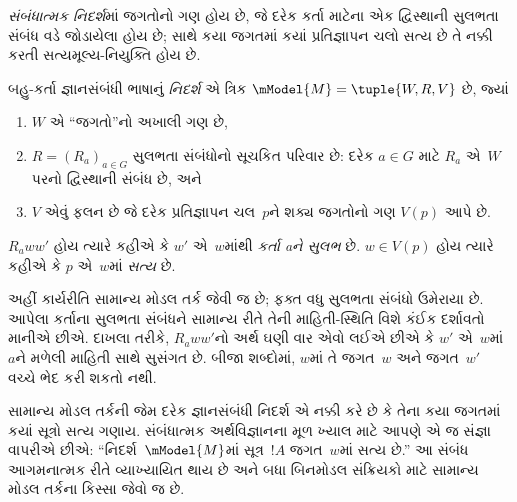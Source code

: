 \emph{સંબંધાત્મક નિદર્શ}માં જગતોનો ગણ હોય છે, જે દરેક કર્તા
માટેના એક દ્વિસ્થાની સુલભતા સંબંધ વડે જોડાયેલા હોય છે; સાથે
કયા જગતમાં કયાં પ્રતિજ્ઞાપન ચલો સત્ય છે તે નક્કી
કરતી સત્યમૂલ્ય-નિયુક્તિ હોય છે.

\begin{defn}
  બહુ-કર્તા જ્ઞાનસંબંધી ભાષાનું \emph{નિદર્શ} એ ત્રિક
  $\mModel{M} = \tuple{W, R, V}$ છે, જ્યાં
  \begin{enumerate}
  \item $W$ એ ``જગતો''નો અખાલી ગણ છે,
  \item $R=(R_a)_{a\in G}$ સુલભતા સંબંધોનો સૂચકિત પરિવાર છે:
  દરેક $a \in G$ માટે ${R}_a$ એ~$W$ પરનો દ્વિસ્થાની સંબંધ છે, અને
  \item $V$ એવું ફલન છે જે દરેક પ્રતિજ્ઞાપન ચલ~$p$ને શક્ય જગતોનો ગણ $V(p)$ આપે છે.
  \end{enumerate}
  $R_a ww'$ હોય ત્યારે કહીએ કે $w'$ એ~$w$માંથી
  \emph{કર્તા aને સુલભ} છે. $w \in V(p)$ હોય ત્યારે કહીએ કે
  $p$ એ~$w$માં \emph{સત્ય} છે.
\end{defn}


અહીં કાર્યરીતિ સામાન્ય મોડલ તર્ક જેવી જ છે; ફક્ત વધુ સુલભતા
સંબંધો ઉમેરાયા છે. આપેલા કર્તાના સુલભતા સંબંધને સામાન્ય રીતે
તેની માહિતી-સ્થિતિ વિશે કંઈક દર્શાવતો માનીએ છીએ. દાખલા તરીકે,
$R_a ww'$નો અર્થ ઘણી વાર એવો લઈએ છીએ કે $w'$ એ~$w$માં~$a$ને
મળેલી માહિતી સાથે સુસંગત છે. બીજા શબ્દોમાં, $w$માં તે
જગત~$w$ અને જગત~$w'$ વચ્ચે ભેદ કરી શકતો નથી.
\endgroup

\begingroup
\makeatletter{}\makeatother


\label{guunit:OLP-0486}


સામાન્ય મોડલ તર્કની જેમ દરેક જ્ઞાનસંબંધી નિદર્શ એ નક્કી કરે છે કે
તેના કયા જગતમાં કયાં સૂત્રો સત્ય ગણાય. સંબંધાત્મક
અર્થવિજ્ઞાનના મૂળ ખ્યાલ માટે આપણે એ જ સંજ્ઞા વાપરીએ છીએ:
``નિદર્શ~$\mModel{M}$માં સૂત્ર~$!A$ જગત~$w$માં સત્ય છે.''
આ સંબંધ આગમનાત્મક રીતે વ્યાખ્યાયિત થાય છે અને બધા બિનમોડલ
સંક્રિયકો માટે સામાન્ય મોડલ તર્કના કિસ્સા જેવો જ છે.

